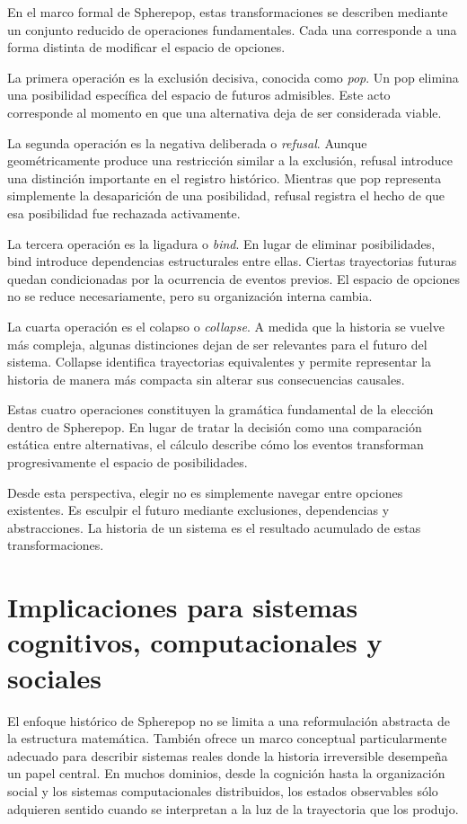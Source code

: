 \documentclass[12pt]{article}
\begin{document}
En el marco formal de Spherepop, estas transformaciones se describen mediante un conjunto reducido de operaciones fundamentales. Cada una corresponde a una forma distinta de modificar el espacio de opciones.

La primera operación es la exclusión decisiva, conocida como \emph{pop}. Un pop elimina una posibilidad específica del espacio de futuros admisibles. Este acto corresponde al momento en que una alternativa deja de ser considerada viable.

La segunda operación es la negativa deliberada o \emph{refusal}. Aunque geométricamente produce una restricción similar a la exclusión, refusal introduce una distinción importante en el registro histórico. Mientras que pop representa simplemente la desaparición de una posibilidad, refusal registra el hecho de que esa posibilidad fue rechazada activamente.

La tercera operación es la ligadura o \emph{bind}. En lugar de eliminar posibilidades, bind introduce dependencias estructurales entre ellas. Ciertas trayectorias futuras quedan condicionadas por la ocurrencia de eventos previos. El espacio de opciones no se reduce necesariamente, pero su organización interna cambia.

La cuarta operación es el colapso o \emph{collapse}. A medida que la historia se vuelve más compleja, algunas distinciones dejan de ser relevantes para el futuro del sistema. Collapse identifica trayectorias equivalentes y permite representar la historia de manera más compacta sin alterar sus consecuencias causales.

Estas cuatro operaciones constituyen la gramática fundamental de la elección dentro de Spherepop. En lugar de tratar la decisión como una comparación estática entre alternativas, el cálculo describe cómo los eventos transforman progresivamente el espacio de posibilidades.

Desde esta perspectiva, elegir no es simplemente navegar entre opciones existentes. Es esculpir el futuro mediante exclusiones, dependencias y abstracciones. La historia de un sistema es el resultado acumulado de estas transformaciones.

\section{Implicaciones para sistemas cognitivos, computacionales y sociales}

El enfoque histórico de Spherepop no se limita a una reformulación abstracta de la estructura matemática. También ofrece un marco conceptual particularmente adecuado para describir sistemas reales donde la historia irreversible desempeña un papel central. En muchos dominios, desde la cognición hasta la organización social y los sistemas computacionales distribuidos, los estados observables sólo adquieren sentido cuando se interpretan a la luz de la trayectoria que los produjo.
\end{document}
